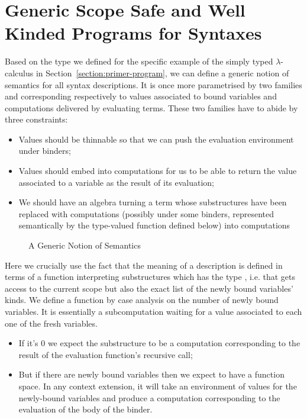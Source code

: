 

\section{Generic Scope Safe and Well Kinded Programs for Syntaxes}\label{section:semantics}

Based on the  type we defined for the specific example of the
simply typed $\lambda$-calculus in Section~\ref{section:primer-program},
we can define a generic notion of
semantics for all syntax descriptions. It is once more parametrised
by two  families  and  corresponding
respectively to values associated to bound variables and
computations delivered by evaluating terms. These two families
have to abide by three constraints:
\begin{itemize}
\item{} Values should be thinnable so that we can push the
      evaluation environment under binders;
\item{} Values should embed into computations for us to be able
      to return the value associated to a variable as the
      result of its evaluation;
\item{} We should have an algebra turning
      a term whose substructures have been replaced with
      computations (possibly under some binders, represented semantically
      by the  type-valued function defined below) into computations
\end{itemize}

\begin{figure}[h]
\caption{A Generic Notion of Semantics}
\end{figure}

Here we crucially use the fact that the meaning of a description is
defined in terms of a function interpreting substructures which has
the type    , i.e. that gets access
to the current scope but also the exact list of the newly bound variables' kinds.
We define a function  by case analysis on the number of newly bound
variables. It is essentially a subcomputation waiting for a value associated to
each one of the fresh variables.
\begin{itemize}
\item If it's $0$ we expect the substructure to be a computation corresponding
    to the result of the evaluation function's recursive call;
  \item But if there are newly bound variables then we expect to have a function
    space. In any context extension, it will take an environment of values for
    the newly-bound variables and produce a computation corresponding to the
    evaluation of the body of the binder.
\end{itemize}

